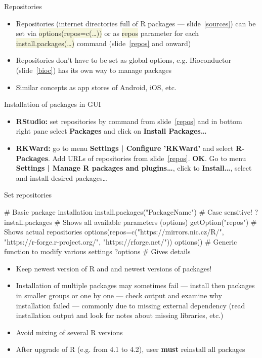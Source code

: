 \documentclass[compress, ucs, xelatex, 11pt, xcolor=svgnames, aspectratio=169,
	hyperref={
		bookmarks=true,
		unicode=true,
		colorlinks=true,
		pdftitle={Molecular data in R},
		plainpages=false,
		pdfauthor={Vojtech Zeisek},
		pdfsubject={Course about phylogeny and evolution in R},
		pdfcreator={XeLaTeX},
		pdfkeywords={R, evolution, phylogeny, molecular data},
		linkcolor=Crimson, %
		anchorcolor=Magenta, %
		citecolor=Magenta, %
		filecolor=Magenta, %
		menucolor=Magenta, %
		urlcolor=DodgerBlue, %
		pdftex},
	url={hyphens, lowtilde} %
	]{beamer}
\renewcommand{\texttt}[1]{\colorbox{Beige}{{\ttfamily #1}}}
\begin{document}
\begin{frame}{Repositories}
	\begin{itemize}
		\item Repositories (internet directories full of R packages --- slide~\ref{sources}) can be set via \texttt{options(repos=c(\ldots))} or as \texttt{repos} parameter for each \texttt{install.packages(\ldots)} command (slide~\ref{repos} and onward)
		\item Repositories don't have to be set as global options, e.g. Bioconductor (slide~\ref{bioc}) has its own way to manage packages
		\item Similar concepts as app stores of Android, iOS, etc.
	\end{itemize}
	\begin{block}{Installation of packages in GUI}
		\begin{itemize}
			\item \textbf{RStudio:} set repositories by command from slide~\ref{repos} and in bottom right pane select \textbf{Packages} and click on \textbf{Install Packages\ldots}
			\item \textbf{RKWard:} go to menu \textbf{Settings | Configure 'RKWard'} and select \textbf{R-Packages}. Add URLs of repositories from slide~\ref{repos}. \textbf{OK}. Go to menu \textbf{Settings | Manage R packages and plugins\ldots}, click to \textbf{Install\ldots}, select and install desired packages\ldots
		\end{itemize}
	\end{block}
\end{frame}

\begin{frame}[fragile]{Set repositories}
	\label{repos}
	\begin{spluscode}
    # Basic package installation
    install.packages("PackageName") # Case sensitive!
    ?install.packages # Shows all available parameters (options)
    getOption("repos") # Shows actual repositories
    options(repos=c("https://mirrors.nic.cz/R/",
      "https://r-forge.r-project.org/", "https://rforge.net/"))
    options() # Generic function to modify various settings
    ?options # Gives details
	\end{spluscode}
	\begin{itemize}
		\item \alert{Keep newest version of R and and newest versions of packages!}
		\item Installation of multiple packages may sometimes fail --- install then packages in smaller groups or one by one --- check output and examine why installation failed --- commonly due to missing external dependency (read installation output and look for notes about missing libraries, etc.)
		\item Avoid mixing of several R versions
		\item After upgrade of R (e.g. from 4.1 to 4.2), user \textbf{must} reinstall all packages
	\end{itemize}
\end{frame}
\end{document}
